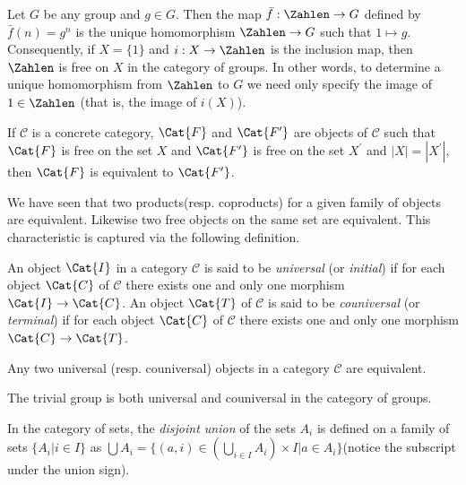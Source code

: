 \begin{Example}
	Let $ G $ be any group and $ g \in G $. Then the map $ \bar{f}:\Zahlen \to G $ defined by $ \bar{f}(n)=g^n $ is the unique homomorphism $ \Zahlen \to G $ such that $ 1 \mapsto g $. Consequently, if $ X = \{1\} $ and $ i:X \to \Zahlen $ is the inclusion map, then $ \Zahlen $ is free on $ X $ in the category of groups. In other words, to determine a unique homomorphism from $ \Zahlen $ to $ G $ we need only specify the image of $ 1 \in \Zahlen $ (that is, the image of $ i(X) $).
\end{Example}
\begin{theorem}
	If $ \mathscr{C} $ is a concrete category, $ \Cat{F} $ and $ \Cat{F^\prime} $ are objects of $ \mathscr{C} $ such that $ \Cat{F} $ is free on the set $ X $ and $ \Cat{F^\prime} $ is free on the set $ X^\prime $ and $ |X|=|X^\prime| $, then $ \Cat{F} $ is equivalent to $ \Cat{F^\prime} $.
\end{theorem}
We have seen that two products(resp. coproducts) for a given family of objects are equivalent. Likewise two free objects on the same set are equivalent. This characteristic is captured via the following definition.
\begin{definition}
	An object $ \Cat{I} $ in a category $ \mathscr{C} $ is said to be \textit{universal} (or \textit{initial}) if for each object $ \Cat{C} $ of $ \mathscr{C} $ there exists one and only one morphism $ \Cat{I} \to \Cat{C} $. An object $ \Cat{T} $ of $ \mathscr{C} $ is said to be \textit{couniversal} (or \textit{terminal}) if for each object $ \Cat{C} $ of $ \mathscr{C} $ there exists one and only one morphism $ \Cat{C} \to \Cat{T} $. 
\end{definition}
\begin{theorem}
	Any two universal (resp. couniversal) objects in a category $ \mathscr{C} $ are equivalent.
\end{theorem}
\begin{Example}
	The trivial group is both universal and couniversal in the category of groups.
\end{Example}
\begin{definition}
	In the category of sets, the \textit{disjoint union} of the sets $ A_i $ is defined on a family of sets $ \{A_i | i \in I \} $ as $ \bigcup A_i=\{(a,i)\in (\bigcup_{i \in I}A_i) \times I|a\in A_i \} $(notice the subscript under the union sign).
\end{definition}




